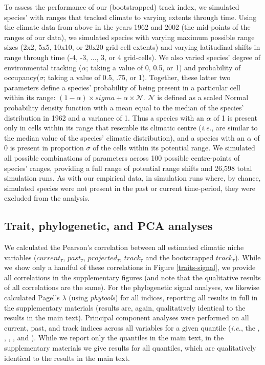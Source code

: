 \documentclass[12pt]{report}
\begin{document}
To assess the performance of our (bootstrapped) track index, we
simulated species' with ranges that tracked climate to varying extents
through time. Using the climate data from above in the years 1962 and
2002 (the mid-points of the ranges of our data), we simulated species
with varying maximum possible range sizes (2x2, 5x5, 10x10, or 20x20
grid-cell extents) and varying latitudinal shifts in range through
time (-4, -3, ..., 3, or 4 grid-cells). We also varied species' degree
of environmental tracking ($\alpha$; taking a value of 0, 0.5, or 1)
and probability of occupancy($\sigma$; taking a value of 0.5, .75, or
1). Together, these latter two parameters define a species'
probability of being present in a particular cell within its range:
$(1-\alpha) \times sigma + \alpha \times \mathcal{N}$.  $\mathcal{N}$
is defined as a scaled Normal probability density function with a mean
equal to the median of the species' distribution in 1962 and a
variance of 1. Thus a species with an $\alpha$ of 1 is present only in
cells within its range that resemble its climatic centre (\emph{i.e.},
are similar to the median value of the species' climatic
distribution), and a species with an $\alpha$ of 0 is present in
proportion $\sigma$ of the cells within its potential range. We
simulated all possible combinations of parameters across 100 possible
centre-points of species' ranges, providing a full range of potential
range shifts and 26,598 total simulation runs. As with our empirical
data, in simulation runs where, by chance, simulated species were not
present in the past or current time-period, they were excluded from
the analysis.

\subsection*{Trait, phylogenetic, and PCA analyses}

We calculated the Pearson's correlation between all estimated climatic
niche variables ($current_\tau$, $past_\tau$, $projected_\tau$,
$track_\tau$ and the bootstrapped $track_\tau$). While we show only a
handful of these correlations in Figure \ref{traits-signal}, we
provide all correlations in the supplementary figures (and note that
the qualitative results of all correlations are the same). For the
phylogenetic signal analyses, we likewise calculated Pagel's $\lambda$
(using \emph{phytools}\supercite{Revell2012phytools}) for all indices,
reporting all results in full in the supplementary materials (results
are, again, qualitatively identical to the results in the main
text). Principal component analyses were performed on all current,
past, and track indices across all variables for a given quantile
(\emph{i.e.}, the , , , , and
). While we report only the  quantiles in the main
text, in the supplementary materials we give results for all
quantiles, which are qualitatively identical to the results in the
main text.

\printbibliography
\end{document}
